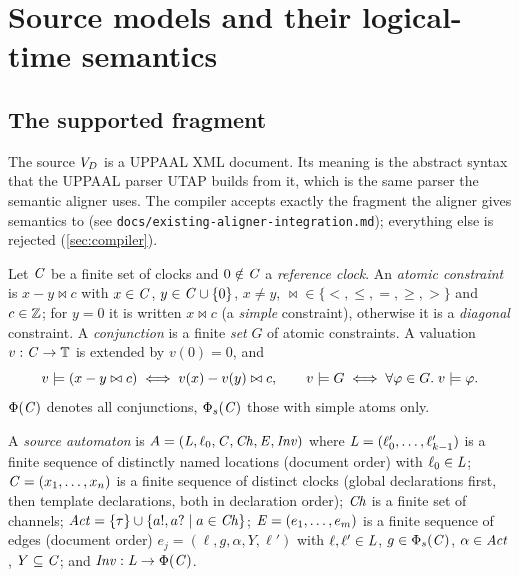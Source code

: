 \section{Source models and their logical-time semantics}\label{sec:source}

\subsection{The supported fragment}

The source $V_D$ is a UPPAAL XML document. Its meaning is the abstract syntax
that the UPPAAL parser UTAP builds from it, which is the same parser the semantic
aligner uses. The compiler accepts exactly the fragment the aligner gives
semantics to (see \texttt{docs/existing-aligner-integration.md}); everything
else is rejected (\cref{sec:compiler}).

\begin{definition}\label{def:constraints}
Let $\mathit{C}$ be a finite set of clocks and $0\notin\mathit{C}$ a \emph{reference clock}.
An \emph{atomic constraint} is $x-y\bowtie c$ with $x\in\mathit{C}$,
$y\in\mathit{C}\cup\{0\}$, $x\neq y$, ${\bowtie}\in\{<,\le,=,\ge,>\}$ and $c\in\mathbb{Z}$;
for $y=0$ it is written $x\bowtie c$ (a \emph{simple} constraint), otherwise it is
a \emph{diagonal} constraint. A \emph{conjunction} is a finite \emph{set} $G$ of
atomic constraints. A valuation $v:\mathit{C}\to\mathbb{T}$ is extended by $v(0)=0$, and
\[
  v\models(x-y\bowtie c)\iff v(x)-v(y)\bowtie c,\qquad
  v\models G\iff \forall\varphi\in G.\;v\models\varphi .
\]
$\Phi(\mathit{C})$ denotes all conjunctions, $\Phi_s(\mathit{C})$ those with simple atoms only.
\end{definition}

\begin{definition}\label{def:source}
A \emph{source automaton} is $A=(\mathit{L},\ell_0,\mathit{C},\mathit{Ch},\mathit{E},\mathit{Inv})$ where
$\mathit{L}=(\ell_0',\dots,\ell_{k-1}')$ is a finite sequence of distinctly named
locations (document order) with $\ell_0\in\mathit{L}$; $\mathit{C}=(x_1,\dots,x_n)$ is a
finite sequence of distinct clocks (global declarations first, then template
declarations, both in declaration order); $\mathit{Ch}$ is a finite set of channels;
$\mathit{Act}=\{\tau\}\cup\{a!,a?\mid a\in\mathit{Ch}\}$;
$\mathit{E}=(e_1,\dots,e_m)$ is a finite sequence of edges (document order)
$e_j=(\ell,g,\alpha,Y,\ell')$ with $\ell,\ell'\in\mathit{L}$, $g\in\Phi_s(\mathit{C})$,
$\alpha\in\mathit{Act}$, $Y\subseteq\mathit{C}$; and $\mathit{Inv}:\mathit{L}\to\Phi(\mathit{C})$.
\end{definition}

